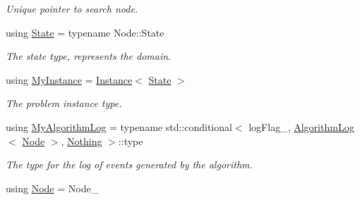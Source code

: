 \begin{DoxyCompactItemize}
\begin{DoxyCompactList}\small\item\em Unique pointer to search node. \end{DoxyCompactList}\item 
using \hyperlink{structalgorithm_1_1BaseTraits_aa61b1003453764d9ca52cb1087526ba4}{State} = typename Node\+::\+State\hypertarget{structalgorithm_1_1BaseTraits_aa61b1003453764d9ca52cb1087526ba4}{}\label{structalgorithm_1_1BaseTraits_aa61b1003453764d9ca52cb1087526ba4}

\begin{DoxyCompactList}\small\item\em The state type, represents the domain. \end{DoxyCompactList}\item 
using \hyperlink{structalgorithm_1_1BaseTraits_a38163af455fcd59619d980365d56a63f}{My\+Instance} = \hyperlink{structInstance}{Instance}$<$ \hyperlink{structalgorithm_1_1BaseTraits_aa61b1003453764d9ca52cb1087526ba4}{State} $>$\hypertarget{structalgorithm_1_1BaseTraits_a38163af455fcd59619d980365d56a63f}{}\label{structalgorithm_1_1BaseTraits_a38163af455fcd59619d980365d56a63f}

\begin{DoxyCompactList}\small\item\em The problem instance type. \end{DoxyCompactList}\item 
using \hyperlink{structalgorithm_1_1BaseTraits_a4cfe4deab94cc6c473b0b20dfbce66fd}{My\+Algorithm\+Log} = typename std\+::conditional$<$ log\+Flag\+\_\+, \hyperlink{structAlgorithmLog}{Algorithm\+Log}$<$ \hyperlink{structalgorithm_1_1BaseTraits_a95cf86d8632b01d605a17c5044d06873}{Node} $>$, \hyperlink{structNothing}{Nothing} $>$\+::type\hypertarget{structalgorithm_1_1BaseTraits_a4cfe4deab94cc6c473b0b20dfbce66fd}{}\label{structalgorithm_1_1BaseTraits_a4cfe4deab94cc6c473b0b20dfbce66fd}

\begin{DoxyCompactList}\small\item\em The type for the log of events generated by the algorithm. \end{DoxyCompactList}\item 
using \hyperlink{structalgorithm_1_1BaseTraits_a95cf86d8632b01d605a17c5044d06873}{Node} = Node\+\_\+\hypertarget{structalgorithm_1_1BaseTraits_a95cf86d8632b01d605a17c5044d06873}{}\label{structalgorithm_1_1BaseTraits_a95cf86d8632b01d605a17c5044d06873}


\end{DoxyCompactItemize}
